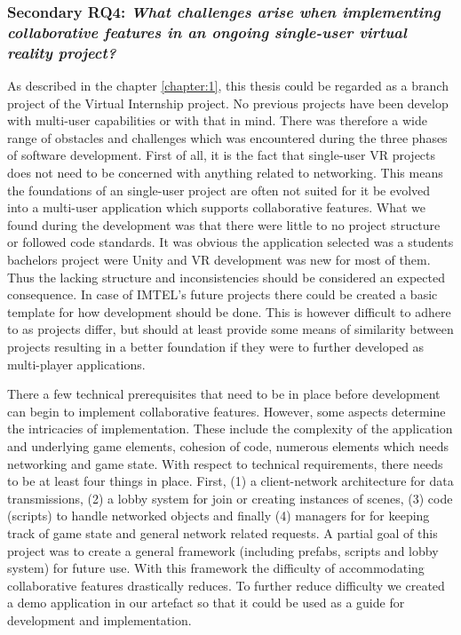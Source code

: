 

\subsubsection{Secondary RQ4: \textit{What challenges arise when implementing collaborative features in an ongoing
single-user virtual reality project?}} 

As described in the chapter \ref{chapter:1}, this thesis could be regarded as a branch project of the Virtual Internship project. No previous projects have been develop with multi-user capabilities or with that in mind. There was therefore a wide range of obstacles and challenges which was encountered during the three phases of software development. First of all, it is the fact that single-user VR projects does not need to be concerned with anything related to networking. This means the foundations of an single-user project are often not suited for it be evolved into a multi-user application which supports collaborative features. What we found during the development was that there were little to no project structure or followed code standards. It was obvious the application selected was a students bachelors project were Unity and VR development was new for most of them. Thus the lacking structure and inconsistencies should be considered an expected consequence. In case of IMTEL's future projects there could be created a basic template for how development should be done. This is however difficult to adhere to as projects differ, but should at least provide some means of similarity between projects resulting in a better foundation if they were to further developed as multi-player applications.    

There a few technical prerequisites that need to be in place before development can begin to implement collaborative features. However, some aspects determine the intricacies of implementation. These include the complexity of the application and underlying game elements, cohesion of code, numerous elements which needs networking and game state. With respect to technical requirements, there needs to be at least four things in place. First, (1) a  client-network architecture for data transmissions, (2) a lobby system for join or creating instances of scenes, (3) code (scripts) to handle networked objects and finally (4) managers for for keeping track of game state and general network related requests.
A partial goal of this project was to create a general framework (including prefabs, scripts and lobby system) for future use. With this framework the difficulty of accommodating collaborative features drastically reduces. To further reduce difficulty we created a demo application in our artefact so that it could be used as a guide for development and implementation.    

